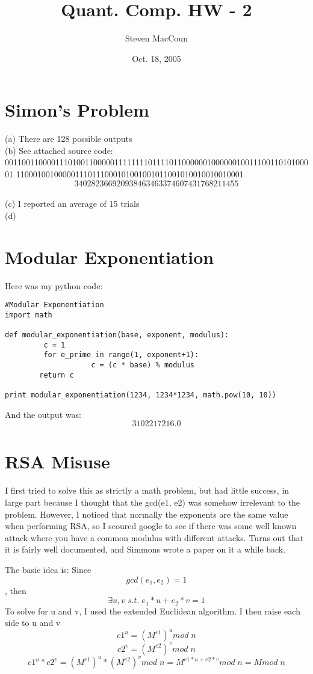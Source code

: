 \documentclass[12pt]{article}
\title{Quant. Comp. HW - 2}
\author{Steven MacCoun}
\date{Oct. 18, 2005}
\begin{document}
\maketitle						%



\section{Simon's Problem}

(a) There are 128 possible outputs
\\(b) See attached source code: \\00110011000011101001100000111111110111101100000010000001001110011010100001
110001001000001110111000101001001011001010010010010001
\[
\boxed{340282366920938463463374607431768211455}
\]
\\(c) I reported an average of 15 trials
\\(d) 

\section{Modular Exponentiation}

Here was my python code:

\begin{verbatim}
#Modular Exponentiation
import math

def modular_exponentiation(base, exponent, modulus):
         c = 1
         for e_prime in range(1, exponent+1):
                    c = (c * base) % modulus
        return c

print modular_exponentiation(1234, 1234*1234, math.pow(10, 10))
\end{verbatim}
And the output was: \[\boxed{3102217216.0}\] 


\section{RSA Misuse}

I first tried to solve this as strictly a math problem, but had little success, in large part because I thought that
the gcd(e1, e2) was somehow irrelevant to the problem. However, I noticed that normally the exponents are the same value
when performing RSA, so I scoured google to see if there was some well known attack where you have a common modulus with
different attacks. Turns out that it is fairly well documented, and Simmons wrote a paper on it a while back.

The basic idea is:
Since \[gcd(e_1,e_2) = 1\],
then \[\exists u, v   \;  s.t.   \;  e_1*u + e_2*v = 1\]
To solve for u and v, I used the extended Euclidean algorithm.
I then raise each side to u and v
\[c1^u = (M^{e1})^{u} mod \; n\]
\[c2^v = (M^{e2})^{v} mod \; n\]
\[c1^u * c2^v =  (M^{e1})^{u}*(M^{e2})^{v} mod \; n =  M^{e1*u + e2*v} mod \; n = M mod \; n\]
\end{document}
